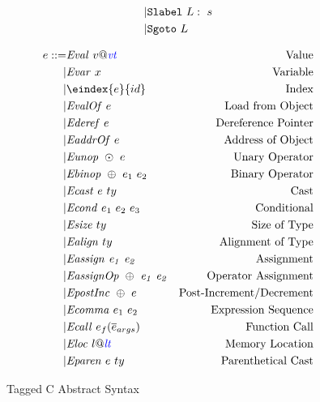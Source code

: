 \documentclass[acmsmall,review,anonymous]{acmart}\settopmatter{printfolios=true,printccs=false,printacmref=false}
\begin{document}
\begin{figure}
\begin{subfigure}[t]{0.3\textwidth}
\[\begin{aligned}
    | & \mathtt{Slabel} ~ L: ~ s \\
    | & \mathtt{Sgoto} ~ L \\    
    \end{aligned}\]
  \end{subfigure}
  \begin{subfigure}[t]{0.69\textwidth}
    \[\begin{aligned}
    \expr ::= & \val{v}{\vt} & \textnormal{Value} \\
    | & \var{x} & \textnormal{Variable} \\
    | & \eindex{\expr}{id} & \textnormal{Index} \\
    | & \valof{\expr} & \textnormal{Load from Object} \\
    | & \deref{\expr} & \textnormal{Dereference Pointer} \\
    | & \addrof{\expr} & \textnormal{Address of Object} \\
    | & \unop{\odot}{\expr} & \textnormal{Unary Operator} \\
    | & \binop{\oplus}{\expr_1}{\expr_2} & \textnormal{Binary Operator} \\
    | & \cast{\expr}{ty} & \textnormal{Cast} \\
    | & \condition{\expr_1}{\expr_2}{\expr_3} & \textnormal{Conditional} \\
    | & \sizeof{ty} & \textnormal{Size of Type} \\
    | & \alignof{ty} & \textnormal{Alignment of Type} \\
    | & \assign{\expr_1}{\expr_2} & \textnormal{Assignment} \\
    | & \assignop{\oplus}{\expr_1}{\expr_2} & \textnormal{Operator Assignment} \\
    | & \postinc{\oplus}{\expr} & \textnormal{Post-Increment/Decrement} \\
    | & \comma{\expr_1}{\expr_2} & \textnormal{Expression Sequence} \\
    | & \call{\expr_f}{\overline{\expr}_{args}} & \textnormal{Function Call} \\
    | & \loc{l}{\lt} & \textnormal{Memory Location} \\
    | & \paren{\expr}{ty} & \textnormal{Parenthetical Cast} \\
    \end{aligned}\]
  \end{subfigure}
  \caption{Tagged C Abstract Syntax}
  \label{fig:syntax}
\end{figure}
\end{document}
